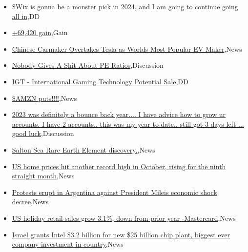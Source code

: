 \documentclass{article}%
\begin{document}
%
\begin{itemize}%
\item%
\href{https://reddit.com/r/wallstreetbets/comments/18rzsdx/wix\_is\_gonna\_be\_a\_monster\_pick\_in\_2024\_and\_i\_am/}{\$Wix is gonna be a monster pick in 2024, and I am going to continue going all in},DD%
\item%
\href{https://reddit.com/r/wallstreetbets/comments/18rt0j7/69420\_gain/}{+69,420 gain},Gain%
\item%
\href{https://reddit.com/r/wallstreetbets/comments/18rrwys/chinese\_carmaker\_overtakes\_tesla\_as\_worlds\_most/}{Chinese Carmaker Overtakes Tesla as Worlds Most Popular EV Maker},News%
\item%
\href{https://reddit.com/r/wallstreetbets/comments/18rpjtl/nobody\_gives\_a\_shit\_about\_pe\_ratios/}{Nobody Gives A Shit About PE Ratios},Discussion%
\item%
\href{https://reddit.com/r/wallstreetbets/comments/18rpdz5/igt\_international\_gaming\_technology\_potential\_sale/}{IGT - International Gaming Technology Potential Sale},DD%
\item%
\href{https://reddit.com/r/wallstreetbets/comments/18ro1ea/amzn\_puts/}{\$AMZN puts!!!!},News%
\item%
\href{https://reddit.com/r/StockMarket/comments/18rjnfq/2023\_was\_definitely\_a\_bounce\_back\_year\_i\_have/}{2023 was definitely a bounce back year.... I have advice how to grow ur accounts. I have 2 accounts.. this was my year to date.. still got 3 days left ... good luck},Discussion%
\item%
\href{https://reddit.com/r/Economics/comments/18rkpmu/salton\_sea\_rare\_earth\_element\_discovery/}{Salton Sea Rare Earth Element discovery.},News%
\item%
\href{https://reddit.com/r/Economics/comments/18rgrfb/us\_home\_prices\_hit\_another\_record\_high\_in\_october/}{US home prices hit another record high in October, rising for the ninth straight month},News%
\item%
\href{https://reddit.com/r/Economics/comments/18rg80s/protests\_erupt\_in\_argentina\_against\_president/}{Protests erupt in Argentina against President Mileis economic shock decree},News%
\item%
\href{https://reddit.com/r/Economics/comments/18rdsey/us\_holiday\_retail\_sales\_grow\_31\_down\_from\_prior/}{US holiday retail sales grow 3.1\%, down from prior year -Mastercard},News%
\item%
\href{https://reddit.com/r/Economics/comments/18rdq9l/israel\_grants\_intel\_32\_billion\_for\_new\_25\_billion/}{Israel grants Intel \$3.2 billion for new \$25 billion chip plant, biggest ever company investment in country},News%
\end{itemize}%
\end{document}

